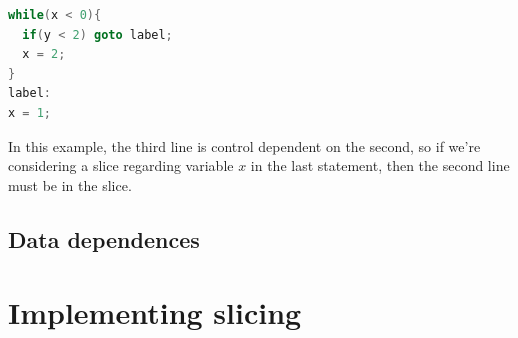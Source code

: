 \documentclass[oneside,12pt,a4paper]{book}
\begin{document}
\begin{lstlisting}[language=C++]
while(x < 0){
  if(y < 2) goto label; 
  x = 2;
}
label:
x = 1;
\end{lstlisting}

In this example, the third line is control dependent on the second, so if we're considering a slice regarding variable $x$ in the last statement, then the second line must be in the slice.

\subsection{Data dependences}

\section{Implementing slicing}
\end{document}
